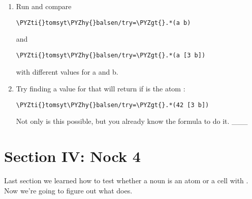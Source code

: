 \begin{enumerate}
\item Run and compare
\begin{framed_shaded}
\begin{Verbatim}[fontsize=\relsize{-2.5},fontseries=b,commandchars=\\\{\}]
\PYZti{}tomsyt\PYZhy{}balsen/try=\PYZgt{}.*(a b)
\end{Verbatim}
\end{framed_shaded}
 and 
\begin{framed_shaded}
\begin{Verbatim}[fontsize=\relsize{-2.5},fontseries=b,commandchars=\\\{\}]
\PYZti{}tomsyt\PYZhy{}balsen/try=\PYZgt{}.*(a [3 b])
\end{Verbatim}
\end{framed_shaded}
 with different values for a and b.
\item Try finding a value for  that will return  if  is the atom :
\begin{framed_shaded}
\begin{Verbatim}[fontsize=\relsize{-2.5},fontseries=b,commandchars=\\\{\}]
\PYZti{}tomsyt\PYZhy{}balsen/try=\PYZgt{}.*(42 [3 b])
\end{Verbatim}
\end{framed_shaded}
 Not only is this possible, but you already know the formula to do it.
\_\_\_
\end{enumerate}

\section{Section IV: Nock 4}

Last section we learned how to test whether a noun is an atom or a cell with
. Now we're going to figure out what  does.


